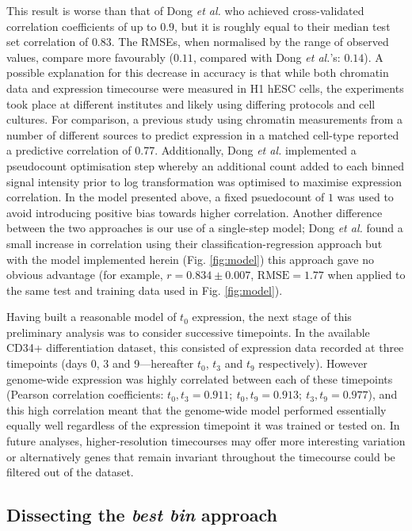 \documentclass[a4paper,11pt,oneside]{book}
\begin{document}
This result is worse than that of Dong \emph{et al.}
who achieved cross-validated correlation coefficients of up to $0.9$,
but it is roughly equal to their median test set correlation of
$0.83$.\cite{Dong2012} The RMSEs, when normalised by the range of
observed values, compare more favourably ($0.11$, compared with Dong \emph{et al.}'s: $0.14$). A possible explanation for this decrease in
accuracy is that while both chromatin data and expression timecourse
were measured in H1 hESC cells, the experiments took place at
different institutes and likely using differing protocols and cell cultures. For comparison, a previous study using chromatin
measurements from a number of different sources to predict expression
in a matched cell-type reported a predictive correlation of 0.77.\cite{Karlic2010} Additionally, Dong \emph{et al.} implemented a pseudocount
optimisation step whereby an additional count added to each binned signal
intensity prior to log transformation was optimised to maximise
expression correlation. In the model presented above, a fixed
psuedocount of $1$ was used to avoid introducing positive bias towards
higher correlation. Another difference between the two approaches is
our use of a single-step model; Dong \emph{et al.} found a small
increase in correlation using their classification-regression approach
but with the model implemented herein (Fig. \ref{fig:model}) this approach gave no obvious advantage (for
example, $r
= 0.834 \pm 0.007$, $\textrm{RMSE} = 1.77$ when applied to the same test and
training data used in Fig. \ref{fig:model}).

Having built a reasonable model of $t_0$ expression, the next stage of
this preliminary analysis was to consider successive timepoints. In the
available CD34+ differentiation dataset, this consisted of expression
data recorded at three
timepoints (days 0, 3 and 9---hereafter $t_0$, $t_3$ and $t_9$
respectively). However genome-wide expression
was highly correlated between each of these timepoints (Pearson correlation coefficients: $t_0, t_3 = 0.911; ~t_0,t_9 =
0.913; ~t_3,t_9 = 0.977$), and this high correlation meant that the
genome-wide model performed essentially equally well regardless of the
expression timepoint it was trained or tested on. In future analyses, higher-resolution timecourses may offer
more interesting variation or alternatively genes that remain invariant
throughout the timecourse could be filtered out of the dataset. 

\subsection{Dissecting the  \emph{best bin} approach}
\end{document}
